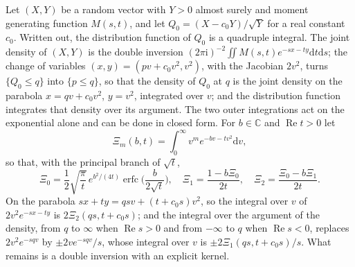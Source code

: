 \documentclass[ecta,nameyear,final]{econsocart}
\newcommand{\dr}[1]{{\mathrm d}#1}
\newcommand{\iu}{{\mathrm i}}
\newcommand{\Rea}{\operatorname{Re}}
\newcommand{\erfc}{\operatorname{erfc}}
\theoremstyle{plain}
\theoremstyle{definition}
\begin{document}
Let $(X,Y)$ be a random vector with $Y>0$ almost surely and moment generating function $M(s,t)$, and let $Q_0=(X-c_0Y)/\sqrt Y$ for a real constant $c_0$.  Written out, the distribution function of $Q_0$ is a quadruple integral.  The joint density of $(X,Y)$ is the double inversion $(2\pi\iu)^{-2}\iint M(s,t)e^{-sx-ty}\dr{t}\dr{s}$; the change of variables $(x,y)=(pv+c_0v^2,v^2)$, with the Jacobian $2v^2$, turns $\{Q_0\le q\}$ into $\{p\le q\}$, so that the density of $Q_0$ at $q$ is the joint density on the parabola $x=qv+c_0v^2$, $y=v^2$, integrated over $v$; and the distribution function integrates that density over its argument.  The two outer integrations act on the exponential alone and can be done in closed form.  For $b\in\mathbb{C}$ and $\Rea t>0$ let
\begin{equation}
\Xi_m(b,t)=\int_0^\infty v^me^{-bv-tv^2}\dr{v},
\label{eq:Jm}
\end{equation}
so that, with the principal branch of $\sqrt t$,
\begin{equation}
\Xi_0=\frac12\sqrt{\frac\pi t}\,e^{b^2/(4t)}\erfc\Big(\frac{b}{2\sqrt t}\Big),\quad
\Xi_1=\frac{1-b\Xi_0}{2t},\quad \Xi_2=\frac{\Xi_0-b\Xi_1}{2t}.
\label{eq:Jrec}
\end{equation}
On the parabola $sx+ty=qsv+(t+c_0s)v^2$, so the integral over $v$ of $2v^2e^{-sx-ty}$ is $2\Xi_2(qs,t+c_0s)$; and the integral over the argument of the density, from $q$ to $\infty$ when $\Rea s>0$ and from $-\infty$ to $q$ when $\Rea s<0$, replaces $2v^2e^{-sqv}$ by $\pm2ve^{-sqv}/s$, whose integral over $v$ is $\pm2\Xi_1(qs,t+c_0s)/s$.  What remains is a double inversion with an explicit kernel.
\end{document}
